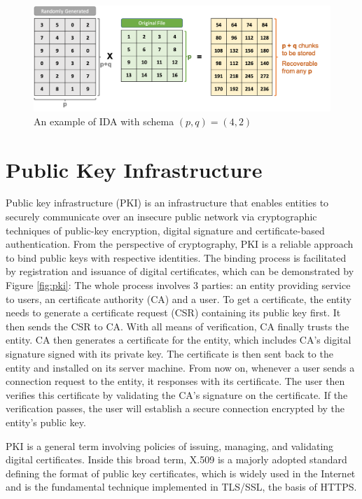 \begin{figure}[hbt]
\centering
  \includegraphics[width=13cm]{figures/ida.png}
  \caption{An example of IDA with schema $(p,q)=(4,2)$}
  \label{fig:ida}
\end{figure}

\section{Public Key Infrastructure}
\label{s:publickeyinfrastructure}

Public key infrastructure (PKI) is an infrastructure that enables entities to securely communicate over an insecure public network via cryptographic techniques of public-key encryption, digital signature and certificate-based authentication. From the perspective of cryptography, PKI is a reliable approach to bind public keys with respective identities. The binding process is facilitated by registration and issuance of digital certificates, which can be demonstrated by Figure \ref{fig:pki}: The whole process involves 3 parties: an entity providing service to users, an certificate authority (CA) and a user. To get a certificate, the entity needs to generate a certificate request (CSR) containing its public key first. It then sends the CSR to CA. With all means of verification, CA finally trusts the entity. CA then generates a certificate for the entity, which includes CA's digital signature signed with its private key. The certificate is then sent back to the entity and installed on its server machine. From now on, whenever a user sends a connection request to the entity, it responses with its certificate. The user then verifies this certificate by validating the CA's signature on the certificate. If the verification passes, the user will establish a secure connection encrypted by the entity's public key.

PKI is a general term involving policies of issuing, managing, and validating digital certificates. Inside this broad term, X.509\cite{rfc4158} is a majorly adopted standard defining the format of public key certificates, which is widely used in the Internet and is the fundamental technique implemented in TLS/SSL, the basis of HTTPS.

